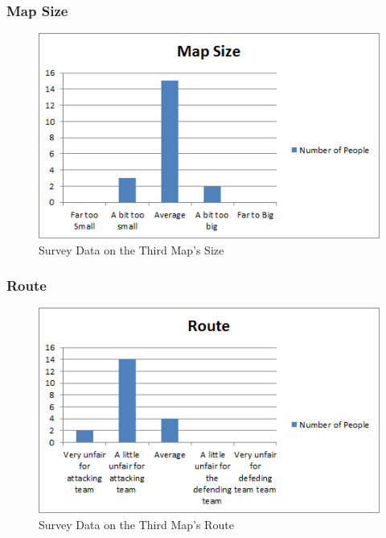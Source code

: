 \documentclass[12pt,a4paper,oneside]{book}
\begin{document}
\subsubsection{Map Size}
\begin{figure}[H]
	\includegraphics[width=1.0\textwidth]{images/Size3.png}
	\caption{Survey Data on the Third Map's Size}
\end{figure}
\subsubsection{Route}
\begin{figure}[H]
	\includegraphics[width=1.0\textwidth]{images/Route3.png}
	\caption{Survey Data on the Third Map's Route}
\end{figure}
\end{document}
